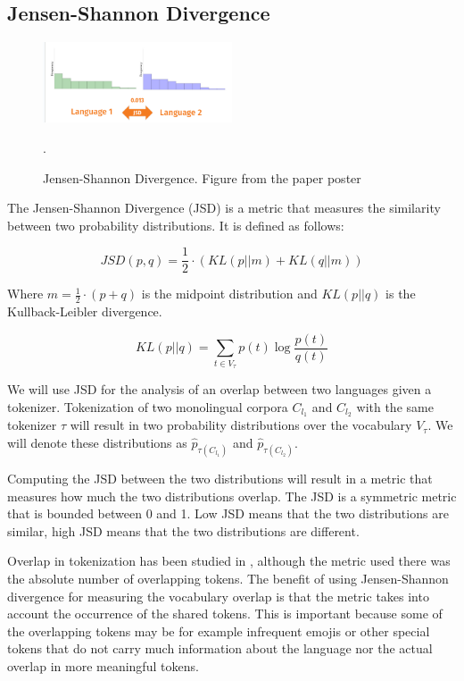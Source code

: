 \subsection{Jensen-Shannon Divergence}
\label{sec:jsd}

\begin{figure}[h]
    \centering
    \includegraphics[width=0.5\textwidth]{img/temp/jsd_example.png}
    \caption{Jensen-Shannon Divergence. Figure from the paper poster \cite{limisiewicz_tokenization_2023}}.
    \label{fig:jsd_example}
\end{figure}

The Jensen-Shannon Divergence (JSD) is a metric that measures the similarity between two probability distributions. It is defined as follows:

\begin{equation}
    JSD(p, q) = \frac{1}{2} \cdot (KL(p||m) + KL(q||m))
\end{equation}

Where $m = \frac{1}{2} \cdot (p + q)$ is the midpoint distribution and $KL(p||q)$ is the Kullback-Leibler divergence. 

\begin{equation}
    KL(p||q) = \sum_{t \in V_\tau} p(t) \log \frac{p(t)}{q(t)}
\end{equation}

We will use JSD for the analysis of an overlap between two languages given a tokenizer. Tokenization of two monolingual corpora $C_{l_1}$ and $C_{l_2}$ with the same tokenizer $\tau$ will result in two probability distributions over the vocabulary $V_\tau$. We will denote these distributions as $\hat{p}_{\tau(C_{l_1})}$ and $\hat{p}_{\tau(C_{l_2})}$. 

Computing the JSD between the two distributions will result in a metric that measures how much the two distributions overlap. The JSD is a symmetric metric that is bounded between 0 and 1. Low JSD means that the two distributions are similar, high JSD means that the two distributions are different. 

Overlap in tokenization has been studied in \citet{wu_beto_2019}, although the metric used there was the absolute number of overlapping tokens. The benefit of using Jensen-Shannon divergence for measuring the vocabulary overlap is that the metric takes into account the occurrence of the shared tokens. This is important because some of the overlapping tokens may be for example infrequent emojis or other special tokens that do not carry much information about the language nor the actual overlap in more meaningful tokens.

